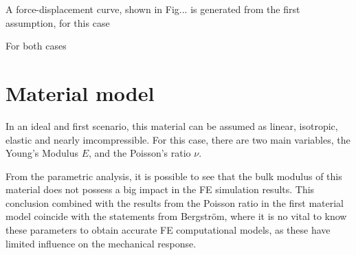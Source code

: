A force-displacement curve, shown in Fig... is generated from the first assumption, 
for this case 

For both cases 
\section{Material model}

In an ideal and first scenario, this material can be assumed as linear, isotropic, 
elastic and nearly imcompressible. For this case, there are two main variables, the Young's
Modulus \(E\), and the Poisson's ratio $\nu$.

From the parametric analysis, it is possible to see that the bulk 
modulus of this material does not possess a big impact in the FE 
simulation results. This conclusion combined with the results 
from the Poisson ratio in the first material model coincide with the 
statements from Bergström, where it is no vital to know these parameters 
to obtain accurate FE computational models, as these have limited
influence on the mechanical response. \cite{Bergström2015} %

